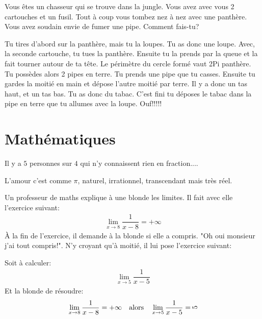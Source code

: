 Vous êtes un chasseur qui se trouve dans la jungle. Vous avez avec vous 2 cartouches et un fusil. Tout à coup vous tombez nez à nez avec une panthère. Vous avez soudain envie de fumer une pipe. Comment fais-tu?

Tu tires d'abord sur la panthère, mais tu la loupes. Tu as donc une loupe. Avec, la seconde cartouche, tu tues la panthère. Ensuite tu la prends par la queue et la fait tourner autour de ta tête. Le périmètre du cercle formé vaut 2Pi panthère. Tu possèdes alors 2 pipes en terre. Tu prends une pipe que tu casses. Ensuite tu gardes la moitié en main et dépose l'autre moitié par terre. Il y a donc un tas haut, et un tas bas. Tu as donc du tabac. C'est fini tu déposes le tabac dans la pipe en terre que tu allumes avec la loupe. Ouf!!!!!

	\pagebreak
	\section{Mathématiques}

Il y a $5$ personnes sur $4$ qui n'y connaissent rien en fraction....

	\begin{center}\underline{\hspace{5 cm}}\end{center}

L'amour c'est comme $\pi$, naturel, irrationnel, transcendant mais très réel.

	\begin{center}\underline{\hspace{5 cm}}\end{center}

Un professeur de maths explique à une blonde les limites. Il fait avec elle l'exercice suivant:
	\begin{gather*}
	\lim_{x \rightarrow 8} \dfrac{1}{x-8}=+\infty
	\end{gather*}
	À la fin de l'exercice, il demande à la blonde si elle a compris. "Oh oui monsieur j'ai tout compris!". N'y croyant qu'à moitié, il lui pose l'exercice suivant:

	Soit à calculer:
	\begin{gather*}
	\lim_{x \rightarrow 5} \dfrac{1}{x-5}
	\end{gather*}
	Et la blonde de résoudre:
	\begin{gather*}
	\lim_{x \rightarrow 8} \dfrac{1}{x-8}=+\infty \quad  \text{alors} \quad \lim_{x \rightarrow 5} \dfrac{1}{x-5}= \rotatebox[origin=c]{90}{5}  
	\end{gather*}
	
